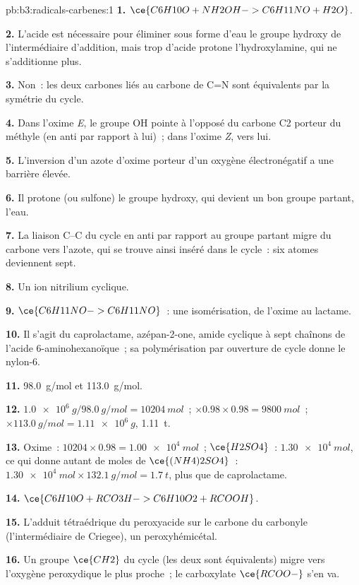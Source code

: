 \begin{solution}{pb:b3:radicals-carbenes:1}
\textbf{1.} $\ce{C6H10O + NH2OH -> C6H11NO + H2O}$.

\textbf{2.} L'acide est nécessaire pour éliminer sous forme d'eau le groupe
hydroxy de l'intermédiaire d'addition, mais trop d'acide protone
l'hydroxylamine, qui ne s'additionne plus.

\textbf{3.} Non~: les deux carbones liés au carbone de C=N sont équivalents
par la symétrie du cycle.

\textbf{4.} Dans l'oxime \textit{E}, le groupe OH pointe à l'opposé du carbone C2 porteur du méthyle (en anti
par rapport à lui)~; dans l'oxime \textit{Z}, vers lui.

\textbf{5.} L'inversion d'un azote d'oxime porteur d'un oxygène
électronégatif a une barrière élevée.

\textbf{6.} Il protone (ou sulfone) le groupe hydroxy, qui devient un bon
groupe partant, l'eau.

\textbf{7.} La liaison C--C du cycle en anti par rapport au groupe partant
migre du carbone vers l'azote, qui se trouve ainsi inséré dans le cycle~:
six atomes deviennent sept.

\textbf{8.} Un ion nitrilium cyclique.

\textbf{9.} $\ce{C6H11NO -> C6H11NO}$~: une isomérisation, de l'oxime au lactame.

\textbf{10.} Il s'agit du caprolactame, azépan-2-one, amide cyclique à sept
chaînons de l'acide 6-aminohexanoïque~; sa polymérisation par ouverture de
cycle donne le nylon-6.

\textbf{11.} \qty{98.0}{g/mol} et \qty{113.0}{g/mol}.

\textbf{12.} $\qty{1.0e6}{g}/\qty{98.0}{g/mol} = \qty{10204}{mol}$~; $\times 0.98 \times 0.98 = \qty{9800}{mol}$~; $\times \qty{113.0}{g/mol} = \qty{1.11e6}{g}$, \qty{1.11}{t}.

\textbf{13.} Oxime~: $\num{10204} \times 0.98 = \qty{1.00e4}{mol}$~; $\ce{H2SO4}$~: $\qty{1.30e4}{mol}$, ce qui donne autant de moles de
$\ce{(NH4)2SO4}$~: $\qty{1.30e4}{mol} \times \qty{132.1}{g/mol} = \qty{1.7}{t}$, plus que de caprolactame.

\textbf{14.} $\ce{C6H10O + RCO3H -> C6H10O2 + RCOOH}$.

\textbf{15.} L'adduit tétraédrique du peroxyacide sur le carbone du
carbonyle (l'intermédiaire de Criegee), un peroxyhémicétal.

\textbf{16.} Un groupe $\ce{CH2}$ du cycle (les deux sont équivalents) migre vers l'oxygène peroxydique
le plus proche~; le carboxylate $\ce{RCOO-}$ s'en va.


\end{solution}
